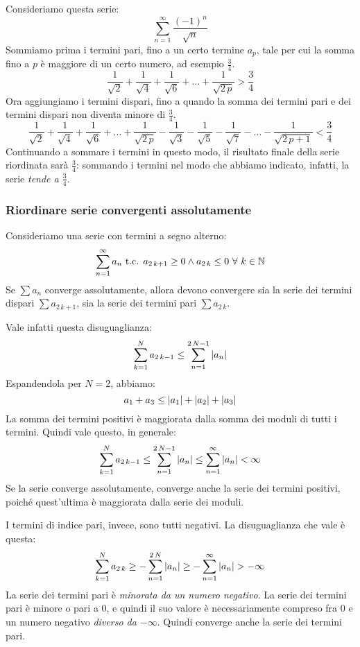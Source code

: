 Consideriamo questa serie:
\[
\sum_{n = 1}^{\infty} \frac{(-1)^n}{\sqrt{n}}
\]
Sommiamo prima i termini pari, fino a un certo termine $a_p$, tale per cui la somma fino a $p$ \`e maggiore di un certo numero, ad esempio $\frac{3}{4}$.
\[
\frac{1}{\sqrt{2}} + \frac{1}{\sqrt{4}} + \frac{1}{\sqrt{6}} + \ldots + \frac{1}{\sqrt{2 \, p}} > \frac{3}{4}
\]
Ora aggiungiamo i termini dispari, fino a quando la somma dei termini pari e dei termini dispari non diventa minore di $\frac{3}{4}$.
\[
\frac{1}{\sqrt{2}} + \frac{1}{\sqrt{4}} + \frac{1}{\sqrt{6}} + \ldots + \frac{1}{\sqrt{2 \, p}} - \frac{1}{\sqrt{3}} - \frac{1}{\sqrt{5}} - \frac{1}{\sqrt{7}} - \ldots - \frac{1}{\sqrt{2 \, p + 1}} < \frac{3}{4}
\]
Continuando a sommare i termini in questo modo, il risultato finale della serie riordinata sar\`a $\frac{3}{4}$: sommando i termini nel modo che abbiamo indicato, infatti, la serie \emph{tende a $\frac{3}{4}$}.

\subsubsection{Riordinare serie convergenti assolutamente}

Consideriamo una serie con termini a segno alterno:
\[
\sum_{n = 1}^{\infty} a_n \text{ t.c. } a_{2 \, k + 1} \ge 0 \land a_{2 \, k} \le 0 \forall k \in \naturals
\]
Se $\sum a_n$ converge assolutamente, allora devono convergere sia la serie dei termini dispari $\sum a_{2 \, k + 1}$, sia la serie dei termini pari $\sum a_{2 \, k}$.

Vale infatti questa disuguaglianza:
\[
\sum_{k = 1}^{N} a_{2 \, k - 1} \le \sum_{n = 1}^{2 \, N -1} \left\lvert{a_n}\right\rvert
\]
Espandendola per $N = 2$, abbiamo:
\[
a_1 + a_3 \le \left\lvert{a_1}\right\rvert + \left\lvert{a_2}\right\rvert + \left\lvert{a_3}\right\rvert
\]
La somma dei termini positivi \`e maggiorata dalla somma dei moduli di tutti i termini. Quindi vale questo, in generale:
\[
\sum_{k = 1}^{N} a_{2 \, k - 1} \le \sum_{n = 1}^{2 \, N -1} \left\lvert{a_n}\right\rvert
\le \sum_{n = 1}^{\infty} \left\lvert{a_n}\right\rvert < \infty
\]
Se la serie converge assolutamente, converge anche la serie dei termini positivi, poich\'e quest'ultima \`e maggiorata dalla serie dei moduli.

I termini di indice pari, invece, sono tutti negativi. La disuguaglianza che vale \`e questa:
\[
\sum_{k = 1}^{N} a_{2 \, k} \ge - \sum_{n = 1}^{2 \, N} \left\lvert{a_n}\right\rvert
\ge - \sum_{n = 1}^{\infty} \left\lvert{a_n}\right\rvert > - \infty
\]
La serie dei termini pari \`e \emph{minorata da un numero negativo}. La serie dei termini pari \`e minore o pari a 0, e quindi il suo valore \`e necessariamente compreso fra 0 e un numero negativo \emph{diverso da $- \infty$}. Quindi converge anche la serie dei termini pari.


